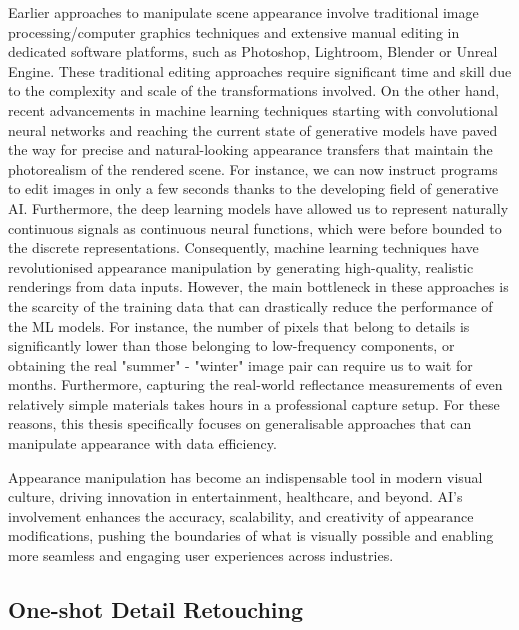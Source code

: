 Earlier approaches to manipulate scene appearance involve traditional image processing/computer graphics techniques and extensive manual editing in dedicated software platforms, such as Photoshop, Lightroom, Blender or Unreal Engine. These traditional editing approaches require significant time and skill due to the complexity and scale of the transformations involved. On the other hand, recent advancements in machine learning techniques starting with convolutional neural networks and reaching the current state of generative models have paved the way for precise and natural-looking appearance transfers that maintain the photorealism of the rendered scene. For instance, we can now instruct programs to edit images in only a few seconds thanks to the developing field of generative AI. Furthermore, the deep learning models have allowed us to represent naturally continuous signals as continuous neural functions, which were before bounded to the discrete representations. Consequently, machine learning techniques have revolutionised appearance manipulation by generating high-quality, realistic renderings from data inputs. However, the main bottleneck in these approaches is the scarcity of the training data that can drastically reduce the performance of the ML models. For instance, the number of pixels that belong to details is significantly lower than those belonging to low-frequency components, or obtaining the real "summer" - "winter" image pair can require us to wait for months. Furthermore, capturing the real-world reflectance measurements of even relatively simple materials takes hours in a professional capture setup. For these reasons, this thesis specifically focuses on generalisable approaches that can manipulate appearance with data efficiency.


Appearance manipulation has become an indispensable tool in modern visual culture, driving innovation in entertainment, healthcare, and beyond. AI's involvement enhances the accuracy, scalability, and creativity of appearance modifications, pushing the boundaries of what is visually possible and enabling more seamless and engaging user experiences across industries.


\subsection{One-shot Detail Retouching}

